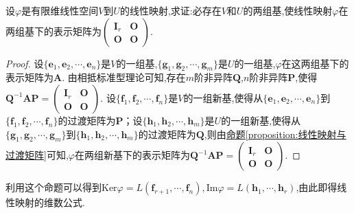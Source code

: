 \documentclass[../../main.tex]{subfiles}%
\begin{document}
\begin{proposition}\label{proposition:线性映射在基下的矩阵为标准型}
设\(\varphi\)是有限维线性空间\(V\)到\(U\)的线性映射,求证:必存在\(V\)和\(U\)的两组基,使线性映射\(\varphi\)在两组基下的表示矩阵为\(\begin{pmatrix}\boldsymbol{I}_r&\boldsymbol{O}\\\boldsymbol{O}&\boldsymbol{O}\end{pmatrix}\).
\end{proposition}
\begin{proof}

设\(\{\boldsymbol{e}_1,\boldsymbol{e}_2,\cdots,\boldsymbol{e}_n\}\)是\(V\)的一组基,\(\{\boldsymbol{g}_1,\boldsymbol{g}_2,\cdots,\boldsymbol{g}_m\}\)是\(U\)的一组基,\(\varphi\)在这两组基下的表示矩阵为\(\boldsymbol{A}\). 由相抵标准型理论可知,存在\(m\)阶非异阵\(\boldsymbol{Q}\),\(n\)阶非异阵\(\boldsymbol{P}\),使得\(\boldsymbol{Q}^{-1}\boldsymbol{A}\boldsymbol{P}=\begin{pmatrix}\boldsymbol{I}_r&\boldsymbol{O}\\\boldsymbol{O}&\boldsymbol{O}\end{pmatrix}\). 设\(\{\boldsymbol{f}_1,\boldsymbol{f}_2,\cdots,\boldsymbol{f}_n\}\)是\(V\)的一组新基,使得从\(\{\boldsymbol{e}_1,\boldsymbol{e}_2,\cdots,\boldsymbol{e}_n\}\)到\(\{\boldsymbol{f}_1,\boldsymbol{f}_2,\cdots,\boldsymbol{f}_n\}\)的过渡矩阵为\(\boldsymbol{P}\)；设\(\{\boldsymbol{h}_1,\boldsymbol{h}_2,\cdots,\boldsymbol{h}_m\}\)是\(U\)的一组新基,使得从\(\{\boldsymbol{g}_1,\boldsymbol{g}_2,\cdots,\boldsymbol{g}_m\}\)到\(\{\boldsymbol{h}_1,\boldsymbol{h}_2,\cdots,\boldsymbol{h}_m\}\)的过渡矩阵为\(\boldsymbol{Q}\),则由\hyperref[proposition:线性映射与过渡矩阵]{命题\ref{proposition:线性映射与过渡矩阵}}可知,\(\varphi\)在两组新基下的表示矩阵为\(\boldsymbol{Q}^{-1}\boldsymbol{A}\boldsymbol{P}=\begin{pmatrix}\boldsymbol{I}_r&\boldsymbol{O}\\\boldsymbol{O}&\boldsymbol{O}\end{pmatrix}\). 

\end{proof}
\begin{remark}
利用这个命题可以得到\(\text{Ker}\varphi = L(\boldsymbol{f}_{r + 1},\cdots,\boldsymbol{f}_n),\text{Im}\varphi = L(\boldsymbol{h}_1,\cdots,\boldsymbol{h}_r)\),由此即得线性映射的维数公式.
\end{remark}
\end{document}
